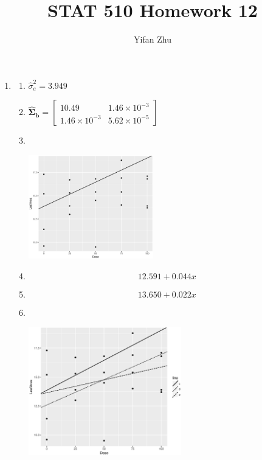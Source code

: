 \documentclass{article}
\begin{document}
\setcounter{MaxMatrixCols}{20}



\title{STAT 510 Homework 12}
\author{Yifan Zhu}
\maketitle

\begin{enumerate}[leftmargin = 0 em, label = \arabic*., font = \bfseries]
	\item
	\begin{enumerate}
		\item 
		$\hat{\sigma}_e^2 = 3.949$
		\item 
	$\hat{\bm \Sigma}_{\bm b} = \begin{bmatrix}
		10.49 & 1.46 \times 10 ^{-3}\\
		1.46 \times 10^{-3} & 5.62 \times 10^{-5}
	\end{bmatrix}$

	\item 
	\ 
	\begin{center}
	\includegraphics[width = 0.45\textwidth]{p1c.eps}
	\end{center}

	\item 
	\[12.591 + 0.044 x\]

	\item 
	\[13.650 + 0.022x\]


	\item 
	 \ 
	 \begin{center}
	 \includegraphics[width = 0.55\textwidth]{p1f.eps}
	 \end{center}



\end{enumerate}
\end{enumerate}
\end{document}
